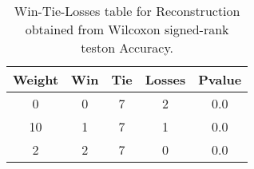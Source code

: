 \begin{table}[H]
\centering
\begin{tabular}{|c|c|c|c|c|}

\textbf{Weight} &  \textbf{Win} &  \textbf{Tie} &  \textbf{Losses} &  \textbf{Pvalue} \\
\hline

              0 &             0 &             7 &                2 &              0.0 \\
\hline
             10 &             1 &             7 &                1 &              0.0 \\
\hline
              2 &             2 &             7 &                0 &              0.0 \\
\hline

\end{tabular}
\caption{Win-Tie-Losses table for Reconstruction obtained from Wilcoxon signed-rank teston Accuracy.}
\label{tab:reconstruction_weighted_cae_comparison}
\end{table}